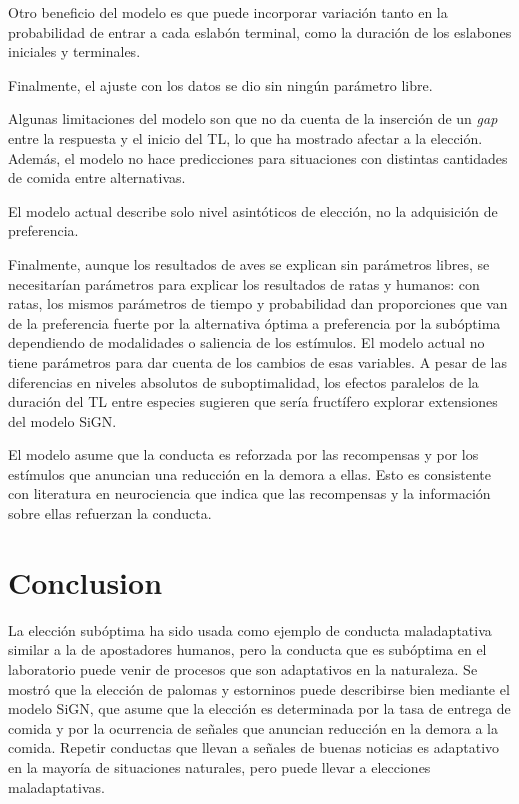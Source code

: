 \documentclass[a4paper,12pt]{article}
\begin{document}
Otro beneficio del modelo es que puede incorporar variación tanto en la probabilidad de entrar a cada eslabón terminal, como la duración de los eslabones iniciales y terminales.

Finalmente, el ajuste con los datos se dio sin ningún parámetro libre.

Algunas limitaciones del modelo son que no da cuenta de la inserción de un {\itshape gap} entre la respuesta y el inicio del TL, lo que ha mostrado afectar a la elección.
Además, el modelo no hace predicciones para situaciones con distintas cantidades de comida entre alternativas.

El modelo actual describe solo nivel asintóticos de elección, no la adquisición de preferencia.

Finalmente, aunque los resultados de aves se explican sin parámetros libres, se necesitarían parámetros para explicar los resultados de ratas y humanos: con ratas, los mismos parámetros de tiempo y probabilidad dan proporciones que van de la preferencia fuerte por la alternativa óptima a preferencia por la subóptima dependiendo de modalidades o saliencia de los estímulos.
El modelo actual no tiene parámetros para dar cuenta de los cambios de esas variables.
A pesar de las diferencias en niveles absolutos de suboptimalidad, los efectos paralelos de la duración del TL entre especies sugieren que sería fructífero explorar extensiones del modelo SiGN.

El modelo asume que la conducta es reforzada por las recompensas y por los estímulos que anuncian una reducción en la demora a ellas.
Esto es consistente con literatura en neurociencia que indica que las recompensas y la información sobre ellas refuerzan la conducta.

\section{Conclusion}

La elección subóptima ha sido usada como ejemplo de conducta maladaptativa similar a la de apostadores humanos, pero la conducta que es subóptima en el laboratorio puede venir de procesos que son adaptativos en la naturaleza.
Se mostró que la elección de palomas y estorninos puede describirse bien mediante el modelo SiGN, que asume que la elección es determinada por la tasa de entrega de comida y por la ocurrencia de señales que anuncian reducción en la demora a la comida.
Repetir conductas que llevan a señales de buenas noticias es adaptativo en la mayoría de situaciones naturales, pero puede llevar a elecciones maladaptativas.
\end{document}

